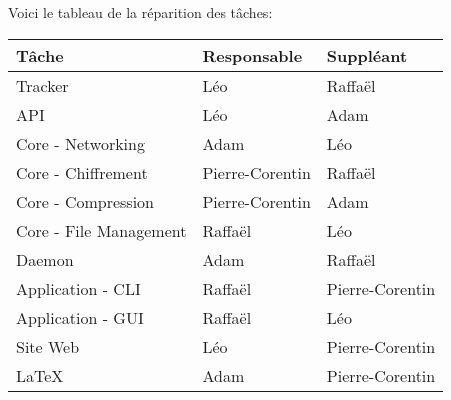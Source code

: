\documentclass[11pt, a4paper]{specifications}
\begin{document}
Voici le tableau de la réparition des tâches:

\begin{table}[H]
\centering
\begin{tabular}{|l|l|l|}
\hline
\textbf{Tâche}         & \textbf{Responsable} & \textbf{Suppléant} \\ \hline
Tracker                & Léo                  & Raffaël            \\ \hline
API                    & Léo                  & Adam               \\ \hline
Core - Networking      & Adam                 & Léo                \\ \hline
Core - Chiffrement     & Pierre-Corentin      & Raffaël            \\ \hline
Core - Compression     & Pierre-Corentin      & Adam               \\ \hline
Core - File Management & Raffaël              & Léo                \\ \hline
Daemon                 & Adam                 & Raffaël            \\ \hline
Application - CLI      & Raffaël              & Pierre-Corentin    \\ \hline
Application - GUI      & Raffaël              & Léo                \\ \hline
Site Web               & Léo                  & Pierre-Corentin    \\ \hline
\LaTeX                 & Adam                 & Pierre-Corentin    \\ \hline
\end{tabular}
\end{table}
\end{document}
